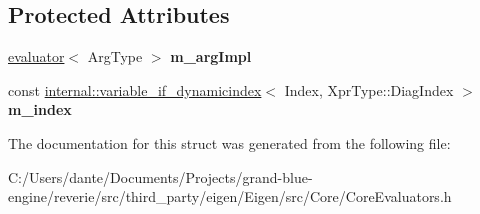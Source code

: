 \subsection*{Protected Attributes}
\begin{DoxyCompactItemize}
\item 
\mbox{\label{struct_eigen_1_1internal_1_1evaluator_3_01_diagonal_3_01_arg_type_00_01_diag_index_01_4_01_4_a77e6e7ca24a3ca3e66958cda5c3c7df6}} 
\mbox{\hyperlink{struct_eigen_1_1internal_1_1evaluator}{evaluator}}$<$ Arg\+Type $>$ {\bfseries m\+\_\+arg\+Impl}
\item 
\mbox{\label{struct_eigen_1_1internal_1_1evaluator_3_01_diagonal_3_01_arg_type_00_01_diag_index_01_4_01_4_a2905600baa8414888bcf26978309c32d}} 
const \mbox{\hyperlink{class_eigen_1_1internal_1_1variable__if__dynamicindex}{internal\+::variable\+\_\+if\+\_\+dynamicindex}}$<$ Index, Xpr\+Type\+::\+Diag\+Index $>$ {\bfseries m\+\_\+index}
\end{DoxyCompactItemize}


The documentation for this struct was generated from the following file\+:\begin{DoxyCompactItemize}
\item 
C\+:/\+Users/dante/\+Documents/\+Projects/grand-\/blue-\/engine/reverie/src/third\+\_\+party/eigen/\+Eigen/src/\+Core/Core\+Evaluators.\+h\end{DoxyCompactItemize}
